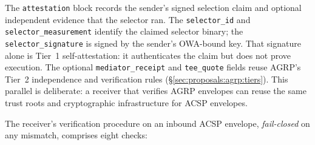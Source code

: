 The \texttt{attestation} block records the sender's signed
selection claim and optional independent evidence that the
selector ran. The \texttt{selector\_id} and
\texttt{selector\_measurement} identify the claimed
selector binary; the \texttt{selector\_signature} is
signed by the sender's OWA-bound key. That signature alone
is Tier~1 self-attestation: it authenticates the claim but
does not prove execution. The optional
\texttt{mediator\_receipt} and \texttt{tee\_quote} fields
reuse AGRP's Tier~2 independence and verification rules
(\S\ref{sec:proposals:agrp:tiers}). This parallel is
deliberate: a receiver that verifies AGRP envelopes can
reuse the same trust roots and cryptographic infrastructure
for ACSP envelopes.

The receiver's verification procedure on an inbound ACSP
envelope, \emph{fail-closed} on any mismatch, comprises
eight checks:

